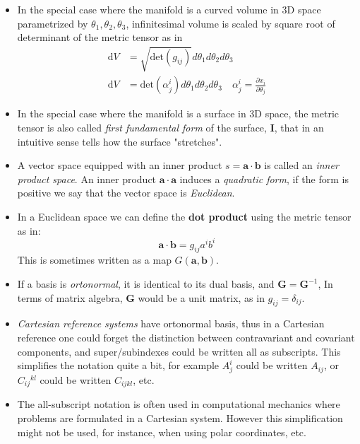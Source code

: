 \documentclass{digitaldynamics}
\def\vect#1{\bm{#1}}
\def\tensor#1{\bm{#1}}
\begin{document}
\begin{itemize}
	\item In the special case where the manifold is a curved volume in 3D space parametrized by $\theta_1, \theta_2, \theta_3$, infinitesimal volume is scaled by square root of determinant of the metric tensor as in
	\begin{align}
	  \mathrm{d}V &= \sqrt{\mathrm{det}(g_{ij})} d\theta_1 d\theta_2 d\theta_3 \\
		\mathrm{d}V &= \mathrm{det}(\alpha^i_j) d\theta_1 d\theta_2 d\theta_3  \quad  \alpha^i_j = \frac{\partial x_i}{\partial \theta_j}
	\label{eq:dvolume}
	\end{align}

	\item In the special case where the manifold is a surface in 3D space, the metric tensor is also called \textit{first fundamental form} of the surface, $\tensor{I}$, that in an intuitive sense tells how the surface "stretches". 
	
	
	

	
	\item A vector space equipped with an inner product $s = \vect{a} \cdot \vect{b}$ is called an \textit{inner product space}. 
	An inner product $\vect{a} \cdot \vect{a}$ induces a \textit{quadratic form}, if the form is positive we say that the vector space is \textit{Euclidean}.
	
	\item In a Euclidean space we can define the \textbf{dot product} using the metric tensor as in:
	\[
	   \vect{a} \cdot \vect{b} = g_{ij} a^i b^i 
	\]
	This is sometimes written as a map $G(\vect{a},\vect{b})$.
	
	\item If a basis is \textit{ortonormal}, it is identical to its dual basis, and $\tensor{G} = \tensor{G}^{-1}$,
	In terms of matrix algebra, $\tensor{G}$ would be a unit matrix, as in $g_{ij} = \delta_{ij}$.
	
	\item \textit{Cartesian reference systems} have ortonormal basis, thus in a Cartesian reference one could forget the distinction between
	contravariant and covariant components, and super/subindexes could be written all as subscripts. This simplifies the notation quite a bit,
	for example $A^{i}_{j}$ could be written $A_{ij}$, or $C_{ij}{}^{kl}$ could be written $C_{ijkl}$, etc.
	
	\item The all-subscript notation is often used in computational mechanics where problems are formulated in a Cartesian system. However this simplification
	might not be used, for instance, when using polar coordinates, etc.

\end{itemize}
\end{document}
